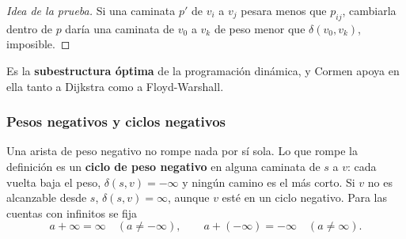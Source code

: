 \documentclass[11pt,letterpaper]{article}
\begin{document}
\begin{proof}[Idea de la prueba]
  Si una caminata $p'$ de $v_i$ a $v_j$ pesara menos que $p_{ij}$,
  cambiarla dentro de $p$ daría una caminata de $v_0$ a $v_k$ de peso
  menor que $\delta(v_0, v_k)$, imposible.
\end{proof}

Es la \textbf{subestructura óptima} de la programación dinámica, y
Cormen apoya en ella tanto a Dijkstra como a Floyd-Warshall.

\subsubsection*{Pesos negativos y ciclos negativos}

Una arista de peso negativo no rompe nada por sí sola. Lo que rompe la
definición es un \textbf{ciclo de peso negativo} en alguna caminata
de $s$ a $v$: cada vuelta baja el peso, $\delta(s, v) = -\infty$ y
ningún camino es el más corto. Si $v$ no es alcanzable desde $s$,
$\delta(s, v) = \infty$, aunque $v$ esté en un ciclo negativo. Para
las cuentas con infinitos se fija
\[
  a + \infty = \infty \quad (a \neq -\infty) , \qquad
  a + (-\infty) = -\infty \quad (a \neq \infty) .
\]
\end{document}
